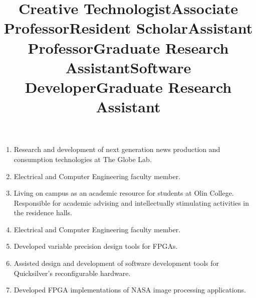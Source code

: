 \documentclass[line]{res}
\begin{document}
\begin{resume}
\begin{enumerate}
		\item {} 
		\title{Creative Technologist} 
		  
		\begin{position}
			Research and development of next generation news production and consumption
      technologies at The Globe Lab.
		\end{position}

		\item {} 
		\title{Associate Professor} 
		  
		\begin{position}
			Electrical and Computer Engineering faculty member. 
		\end{position}
		
		\item {} 
		\title{Resident Scholar} 
		  
		\begin{position}
			Living on campus as an academic resource for students at Olin College. Responsible for academic advising and intellectually stimulating activities in the residence halls. 
		\end{position}
		
		\item {} 
		\title{Assistant Professor} 
		  
		\begin{position}
			Electrical and Computer Engineering faculty member. 
		\end{position}
		
		\item {} 
		\title{Graduate Research Assistant} 
		  
		\begin{position}
			Developed variable precision design tools for FPGAs. 
		\end{position}
		
		\item {} 
		\title{Software Developer} 
		  
		\begin{position}
			Assisted design and development of software development tools for Quicksilver's reconfigurable hardware. 
		\end{position}
		
		\item {} 
		\title{Graduate Research Assistant} 
		  
		\begin{position}
			Developed FPGA implementations of NASA image processing applications. 
		\end{position}
		

\end{enumerate}
\end{resume}
\end{document}
